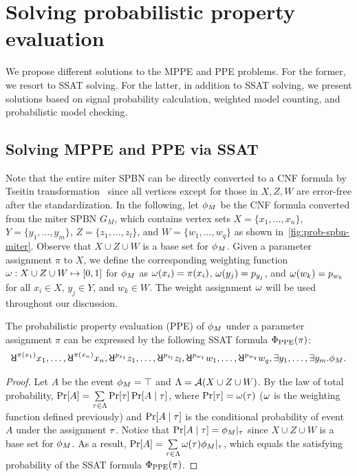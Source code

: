 \section{Solving probabilistic property evaluation}
\label{sect:prob-solutions}

We propose different solutions to the MPPE and PPE problems.
For the former, we resort to SSAT solving.
For the latter, in addition to SSAT solving,
we present solutions based on signal probability calculation,
weighted model counting,
and probabilistic model checking.

\subsection{Solving MPPE and PPE via SSAT}
Note that the entire miter SPBN can be directly converted to a CNF formula by Tseitin transformation~\cite{Tseitin1983}
since all vertices except for those in $X,Z,W$ are error-free after the standardization.
In the following,
let $\phi_M$ be the CNF formula converted from the miter SPBN $G_M$,
which contains vertex sets
$X=\{x_1,\ldots,x_n\}$,
$Y=\{y_1,\ldots,y_m\}$,
$Z=\{z_1,\ldots,z_l\}$, and
$W=\{w_1,\ldots,w_q\}$ as shown in~\cref{fig:prob-spbn-miter}.
Observe that $X \cup Z \cup W$ is a base set for $\phi_M$.
Given a parameter assignment $\pi$ to $X$,
we define the corresponding weighting function $\omega:X\cup Z\cup W\mapsto[0,1]$ for $\phi_M$ as
$\omega(x_i)=\pi(x_i)$,
$\omega(y_j)=p_{y_j}$, and
$\omega(w_k)=p_{w_k}$ for all
$x_i \in X$,
$y_j \in Y$, and
$w_k \in W$.
The weight assignment $\omega$ will be used throughout our discussion.

\begin{theorem}
    \label{thm:prob-ppe-ssat}
    The probabilistic property evaluation (PPE) of $\phi_M$ under a parameter assignment $\pi$ can be expressed
    by the following SSAT formula $\Phi_\mathrm{PPE}(\pi)$:
    \begin{align}
        \label{eq:prob-ppe-ssat}
        \random{\pi(x_1)}x_1,\ldots,\random{\pi(x_n)}x_n,
        \random{p_{z_1}}z_1,\ldots,\random{p_{z_l}}z_l,
        \random{p_{w_1}}w_1,\ldots,\random{p_{w_q}}w_q,
        \exists y_1,\ldots,\exists y_m.
        \pf_M.
    \end{align}
\end{theorem}
\begin{proof}
    Let $A$ be the event $\phi_M=\top$ and $\Lambda=\mathcal{A}(X \cup Z \cup W)$.
    By the law of total probability,
    $\Pr[A]=\sum\limits_{\tau\in\Lambda}\Pr[\tau]\Pr[A\mid\tau]$,
    where $\Pr[\tau]=\omega(\tau)$ ($\omega$ is the weighting function defined previously) and
    $\Pr[A\mid\tau]$ is the conditional probability of event $A$ under the assignment $\tau$.
    Notice that $\Pr[A\mid\tau]=\phi_M|_{\tau}$ since
    $X \cup Z \cup W$ is a base set for $\phi_M$.
    As a result,
    $\Pr[A]=\sum\limits_{\tau\in\Lambda}\omega(\tau)\phi_M|_{\tau}$,
    which equals the satisfying probability of the SSAT formula $\Phi_\mathrm{PPE}(\pi)$.
\end{proof}

